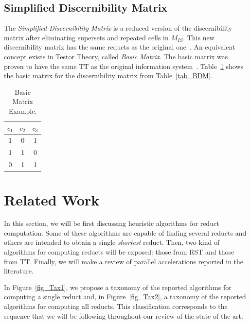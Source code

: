 \documentclass[authoryear,11pt]{elsarticle}
\begin{document}
\subsection{Simplified Discernibility Matrix}
  The \textit{Simplified Discernibility Matrix} is a reduced version of the discernibility matrix after
  eliminating supersets and repeated cells in $M_{IS}$. This new discernibility matrix has the same reducts
  as the original one~\citep{Yao09}. An equivalent concept exists in Testor Theory, called 
  \textit{Basic Matrix}. The basic matrix was proven to have the same TT as the original information
  system~\citep{Lazo01}. Table~\ref{tab_SDM} shows the basic matrix for the
  discernibility matrix from Table~\ref{tab_BDM}.
  
     \begin{table}[htb]
		\caption{Basic Matrix Example.} \label{tab_SDM}
		\centering
 	\begin{tabular}{ccc}
 		$c_1$ & $c_2$ & $c_3$\\
 		\hline
		1 & 0 & 1 \\
		1 & 1 & 0 \\
		0 & 1 & 1
 	\end{tabular}             
 \end{table}

\section{Related Work}\label{relatedWork}
  In this section, we will be first discussing heuristic algorithms for reduct computation. Some of these 
  algorithms are capable of finding several reducts and others are intended to obtain a single \textit{shortest} 
  reduct. Then, two kind of algorithms for computing reducts will be exposed: those 
  from RST and those from TT. Finally, we will make a review of parallel accelerations reported in the literature.  
  
  In Figure~\ref{fig_Tax1}, we propose a taxonomy of the reported algorithms for computing a single reduct
  and, in Figure~\ref{fig_Tax2}, a taxonomy of the reported algorithms for computing all reducts. 
  This classification corresponds to the sequence that we will be following throughout our review of the 
  state of the art.
   
\end{document}
